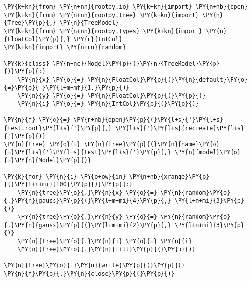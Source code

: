 \begin{Verbatim}[commandchars=\\\{\}]
\PY{k+kn}{from} \PY{n+nn}{rootpy.io} \PY{k+kn}{import} \PY{n+nb}{open}
\PY{k+kn}{from} \PY{n+nn}{rootpy.tree} \PY{k+kn}{import} \PY{n}{Tree}\PY{p}{,} \PY{n}{TreeModel}
\PY{k+kn}{from} \PY{n+nn}{rootpy.types} \PY{k+kn}{import} \PY{n}{FloatCol}\PY{p}{,} \PY{n}{IntCol}
\PY{k+kn}{import} \PY{n+nn}{random}

\PY{k}{class} \PY{n+nc}{Model}\PY{p}{(}\PY{n}{TreeModel}\PY{p}{)}\PY{p}{:}
    \PY{n}{x} \PY{o}{=} \PY{n}{FloatCol}\PY{p}{(}\PY{n}{default}\PY{o}{=}\PY{o}{-}\PY{l+m+mf}{1.}\PY{p}{)}
    \PY{n}{y} \PY{o}{=} \PY{n}{FloatCol}\PY{p}{(}\PY{p}{)}
    \PY{n}{i} \PY{o}{=} \PY{n}{IntCol}\PY{p}{(}\PY{p}{)}

\PY{n}{f} \PY{o}{=} \PY{n+nb}{open}\PY{p}{(}\PY{l+s}{'}\PY{l+s}{test.root}\PY{l+s}{'}\PY{p}{,} \PY{l+s}{'}\PY{l+s}{recreate}\PY{l+s}{'}\PY{p}{)}
\PY{n}{tree} \PY{o}{=} \PY{n}{Tree}\PY{p}{(}\PY{n}{name}\PY{o}{=}\PY{l+s}{'}\PY{l+s}{test}\PY{l+s}{'}\PY{p}{,} \PY{n}{model}\PY{o}{=}\PY{n}{Model}\PY{p}{)}

\PY{k}{for} \PY{n}{i} \PY{o+ow}{in} \PY{n+nb}{xrange}\PY{p}{(}\PY{l+m+mi}{100}\PY{p}{)}\PY{p}{:}
    \PY{n}{tree}\PY{o}{.}\PY{n}{x} \PY{o}{=} \PY{n}{random}\PY{o}{.}\PY{n}{gauss}\PY{p}{(}\PY{l+m+mi}{4}\PY{p}{,} \PY{l+m+mi}{3}\PY{p}{)}
    \PY{n}{tree}\PY{o}{.}\PY{n}{y} \PY{o}{=} \PY{n}{random}\PY{o}{.}\PY{n}{gauss}\PY{p}{(}\PY{l+m+mi}{2}\PY{p}{,} \PY{l+m+mi}{3}\PY{p}{)}
    \PY{n}{tree}\PY{o}{.}\PY{n}{i} \PY{o}{=} \PY{n}{i}
    \PY{n}{tree}\PY{o}{.}\PY{n}{fill}\PY{p}{(}\PY{p}{)}

\PY{n}{tree}\PY{o}{.}\PY{n}{write}\PY{p}{(}\PY{p}{)}
\PY{n}{f}\PY{o}{.}\PY{n}{close}\PY{p}{(}\PY{p}{)}
\end{Verbatim}
